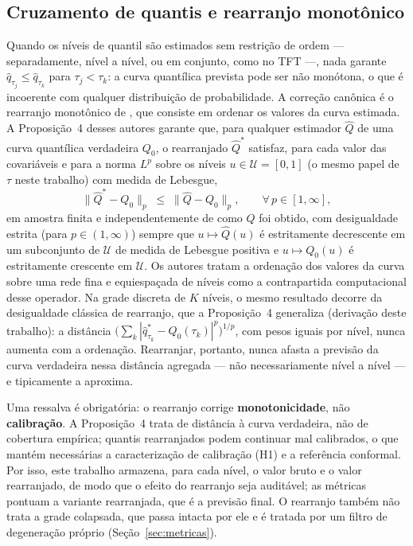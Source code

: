 \subsection{Cruzamento de quantis e rearranjo monotônico}
Quando os níveis de quantil são estimados sem restrição de ordem --- separadamente, nível a nível, ou em conjunto, como no TFT ---, nada garante \(\hat{q}_{\tau_j} \leq \hat{q}_{\tau_k}\) para \(\tau_j < \tau_k\): a curva quantílica prevista pode ser não monótona, o que é incoerente com qualquer distribuição de probabilidade. A correção canônica é o rearranjo monotônico de , que consiste em ordenar os valores da curva estimada. A Proposição~4 desses autores garante que, para qualquer estimador \(\hat{Q}\) de uma curva quantílica verdadeira \(Q_0\), o rearranjado \(\hat{Q}^{*}\) satisfaz, para cada valor das covariáveis e para a norma \(L^p\) sobre os níveis \(u \in \mathcal{U} = [0, 1]\) (o mesmo papel de \(\tau\) neste trabalho) com medida de Lebesgue,
\begin{equation}
    \|\hat{Q}^{*} - Q_0\|_p \;\leq\; \|\hat{Q} - Q_0\|_p, \qquad \forall\, p \in [1, \infty],
    \label{eq:rearranjo}
\end{equation}
em amostra finita e independentemente de como \(\hat{Q}\) foi obtido, com desigualdade estrita (para \(p \in (1,\infty)\)) sempre que \(u \mapsto \hat{Q}(u)\) é estritamente decrescente em um subconjunto de \(\mathcal{U}\) de medida de Lebesgue positiva e \(u \mapsto Q_0(u)\) é estritamente crescente em \(\mathcal{U}\). Os autores tratam a ordenação dos valores da curva sobre uma rede fina e equiespaçada de níveis como a contrapartida computacional desse operador. Na grade discreta de \(K\) níveis, o mesmo resultado decorre da desigualdade clássica de rearranjo, que a Proposição~4 generaliza (derivação deste trabalho): a distância \(\big(\sum_{k}|\hat{q}^{*}_{\tau_k} - Q_0(\tau_k)|^p\big)^{1/p}\), com pesos iguais por nível, nunca aumenta com a ordenação. Rearranjar, portanto, nunca afasta a previsão da curva verdadeira nessa distância agregada --- não necessariamente nível a nível --- e tipicamente a aproxima.

Uma ressalva é obrigatória: o rearranjo corrige \textbf{monotonicidade}, não \textbf{calibração}. A Proposição~4 trata de distância à curva verdadeira, não de cobertura empírica; quantis rearranjados podem continuar mal calibrados, o que mantém necessárias a caracterização de calibração (H1) e a referência conformal. Por isso, este trabalho armazena, para cada nível, o valor bruto e o valor rearranjado, de modo que o efeito do rearranjo seja auditável; as métricas pontuam a variante rearranjada, que é a previsão final. O rearranjo também não trata a grade colapsada, que passa intacta por ele e é tratada por um filtro de degeneração próprio (Seção~\ref{sec:metricas}).

